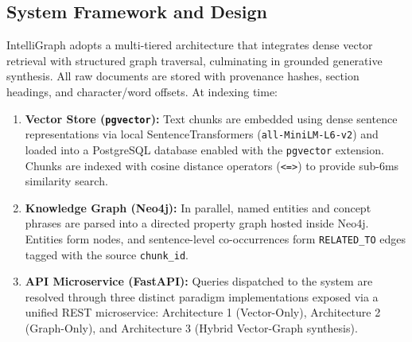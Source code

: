 \documentclass[11pt,a4paper]{article}
\begin{document}
\subsection{System Framework and Design}
IntelliGraph adopts a multi-tiered architecture that integrates dense vector retrieval with structured graph traversal, culminating in grounded generative synthesis. All raw documents are stored with provenance hashes, section headings, and character/word offsets. At indexing time:
\begin{enumerate}[nosep]
  \item \textbf{Vector Store (\texttt{pgvector}):} Text chunks are embedded using dense sentence representations via local SentenceTransformers (\texttt{all-MiniLM-L6-v2}) and loaded into a PostgreSQL database enabled with the \texttt{pgvector} extension. Chunks are indexed with cosine distance operators (\texttt{<=>}) to provide sub-6ms similarity search.
  \item \textbf{Knowledge Graph (Neo4j):} In parallel, named entities and concept phrases are parsed into a directed property graph hosted inside Neo4j. Entities form nodes, and sentence-level co-occurrences form \texttt{RELATED\_TO} edges tagged with the source \texttt{chunk\_id}.
  \item \textbf{API Microservice (FastAPI):} Queries dispatched to the system are resolved through three distinct paradigm implementations exposed via a unified REST microservice: Architecture 1 (Vector-Only), Architecture 2 (Graph-Only), and Architecture 3 (Hybrid Vector-Graph synthesis).
\end{enumerate}
\end{document}
